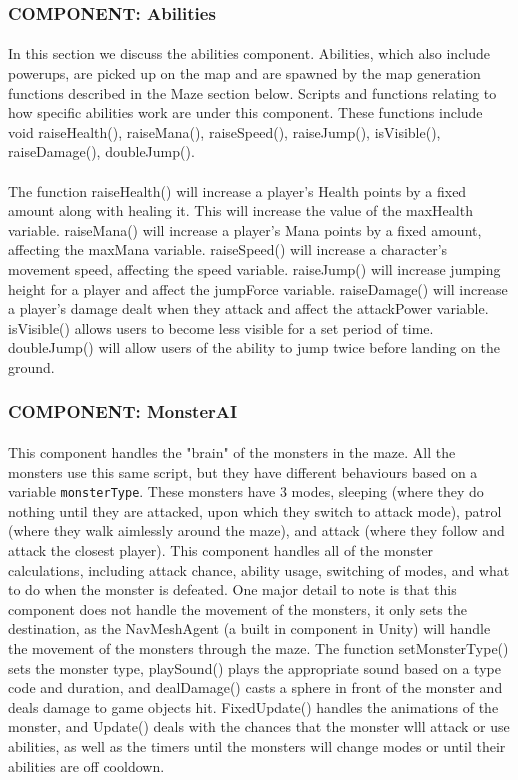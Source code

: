 \documentclass[12pt, titlepage]{article}
\begin{document}
\subsubsection{COMPONENT: Abilities}
\paragraph{} In this section we discuss the abilities component. Abilities, which also include powerups, are picked up on the map and are spawned by the map generation functions described in the Maze section below. Scripts and functions relating to how specific abilities work are under this component. These functions include void raiseHealth(), raiseMana(), raiseSpeed(), raiseJump(), isVisible(), raiseDamage(), doubleJump().
\paragraph{} The function raiseHealth() will increase a player's Health points by a fixed amount along with healing it. This will increase the value of the maxHealth variable. raiseMana() will increase a player's Mana points by a fixed amount, affecting the maxMana variable. raiseSpeed() will increase a character's movement speed, affecting the speed variable. raiseJump() will increase jumping height for a player and affect the jumpForce variable. raiseDamage() will increase a player's damage dealt when they attack and affect the attackPower variable. isVisible() allows users to become less visible for a set period of time. doubleJump() will allow users of the ability to jump twice before landing on the ground.
\subsubsection{COMPONENT: MonsterAI}
\paragraph{}This component handles the "brain" of the monsters in the maze. All the monsters use this same script, but they have different behaviours based on a variable \texttt{monsterType}. These monsters have 3 modes, sleeping (where they do nothing until they are attacked, upon which they switch to attack mode), patrol (where they walk aimlessly around the maze), and attack (where they follow and attack the closest player). This component handles all of the monster calculations, including attack chance, ability usage, switching of modes, and what to do when the monster is defeated. One major detail to note is that this component does not handle the movement of the monsters, it only sets the destination, as the NavMeshAgent (a built in component in Unity) will handle the movement of the monsters through the maze. 
The function setMonsterType() sets the monster type, playSound() plays the appropriate sound based on a type code and duration, and dealDamage() casts a sphere in front of the monster and deals damage to game objects hit. FixedUpdate() handles the animations of the monster, and Update() deals with the chances that the monster wlll attack or use abilities, as well as the timers until the monsters will change modes or until their abilities are off cooldown. 
\end{document}
